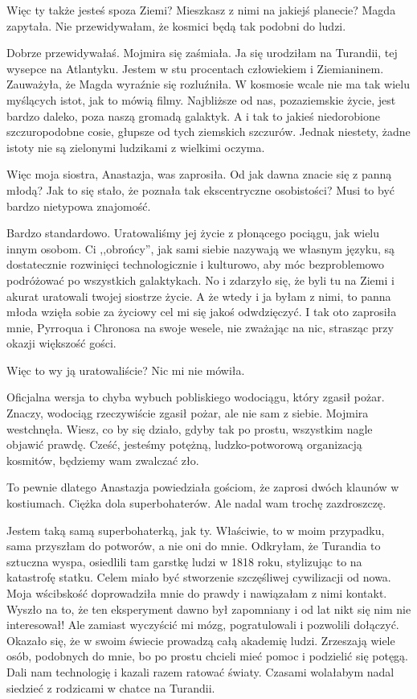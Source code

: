 \ds{} Więc ty także jesteś spoza Ziemi? Mieszkasz z nimi na jakiejś planecie? \dm{} Magda zapytała. \dm{} Nie przewidywałam, że kosmici będą tak podobni do ludzi. \de{}

\ds{} Dobrze przewidywałaś. \dm{} Mojmira się zaśmiała. \dm{} Ja się urodziłam na Turandii, tej wysepce na Atlantyku. Jestem w stu procentach człowiekiem i Ziemianinem.
\dm{} Zauważyła, że Magda wyraźnie się rozluźniła. \dm{} W kosmosie wcale nie ma tak wielu myślących istot, jak to mówią filmy. 
Najbliższe od nas, pozaziemskie życie, jest bardzo daleko, poza naszą gromadą galaktyk. A i tak to jakieś niedorobione szczuropodobne cosie, głupsze od tych ziemskich szczurów.
Jednak niestety, żadne istoty nie są zielonymi ludzikami z wielkimi oczyma.
\de{}

\ds{} Więc moja siostra, Anastazja, was zaprosiła. Od jak dawna znacie się z panną młodą? Jak to się stało, że poznała tak ekscentryczne osobistości? Musi to być bardzo nietypowa znajomość. \de{} 

\ds{} Bardzo standardowo. Uratowaliśmy jej życie z płonącego pociągu, jak wielu innym osobom. 
Ci ,,obrońcy'', jak sami siebie nazywają we własnym języku, są dostatecznie rozwinięci technologicznie i kulturowo, aby móc bezproblemowo podróżować po wszystkich galaktykach.
No i zdarzyło się, że byli tu na Ziemi i akurat uratowali twojej siostrze życie.
A że wtedy i ja byłam z nimi, to panna młoda wzięła sobie za życiowy cel mi się jakoś odwdzięczyć. 
I tak oto zaprosiła mnie, Pyrroqua i Chronosa na swoje wesele, nie zważając na nic, strasząc przy okazji większość gości.\de{}

\ds{} Więc to wy ją uratowaliście? Nic mi nie mówiła. \de{}

\ds{} Oficjalna wersja to chyba wybuch pobliskiego wodociągu, który zgasił pożar. 
Znaczy, wodociąg rzeczywiście zgasił pożar, ale nie sam z siebie.
\dm{} Mojmira westchnęła. \dm{}
Wiesz, co by się działo, gdyby tak po prostu, wszystkim nagle objawić prawdę.
Cześć, jesteśmy potężną, ludzko-potworową organizacją kosmitów, będziemy wam zwalczać zło.

\ds{} To pewnie dlatego Anastazja powiedziała gościom, że zaprosi dwóch klaunów w kostiumach. Ciężka dola superbohaterów. Ale nadal wam trochę zazdroszczę.\de{}

\ds{} Jestem taką samą superbohaterką, jak ty. Właściwie, to w moim przypadku, sama przyszłam do potworów, a nie oni do mnie.
Odkryłam, że Turandia to sztuczna wyspa, osiedlili tam garstkę ludzi w 1818 roku, stylizując to na katastrofę statku.
Celem miało być stworzenie szczęśliwej cywilizacji od nowa. Moja wścibskość doprowadziła mnie do prawdy i nawiązałam z nimi kontakt.
Wyszło na to, że ten eksperyment dawno był zapomniany i od lat nikt się nim nie interesował!
Ale zamiast wyczyścić mi mózg, pogratulowali i pozwolili dołączyć. 
Okazało się, że w swoim świecie prowadzą całą akademię ludzi. Zrzeszają wiele osób, podobnych do mnie, bo po prostu chcieli mieć pomoc i podzielić się potęgą.
Dali nam technologię i kazali razem ratować światy. Czasami wolałabym nadal siedzieć z rodzicami w chatce na Turandii.

